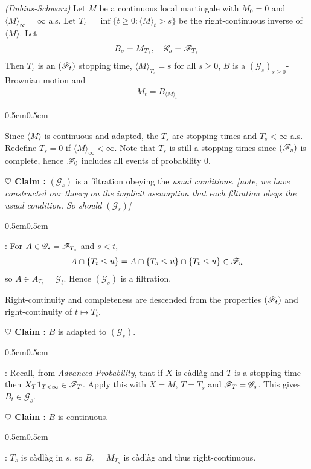 \documentclass[10pt,a4paper]{article}
\newenvironment{proof}
{\begin{changemargin}{0.5cm}{0.5cm} 
	}%
	{\end{changemargin}
}
\newenvironment{subproof}
{\begin{changemargin}{0.5cm}{0.5cm} 
	}%
	{\end{changemargin}
}
\newenvironment{p}
{\begin{proof} 
	}%
	{\end{proof}
}
\begin{document}
\thm \emph{(Dubins-Schwarz)} Let $M$ be a continuous local martingale with $M_0 =0$ and $\langle M \rangle_{\infty} =\infty$ a.s. Let $T_s = \inf \{t\geq 0 : \langle M \rangle_t >s \}$ be the right-continuous inverse of $\langle M \rangle$. Let
\begin{align*}
B_s = M_{T_s}, \quad \mathscr{G}_s = \mathscr{F}_{T_s}
\end{align*}
Then $T_s$ is an $(\mathscr{F}_t)$ stopping time, $\langle M \rangle_{T_s}=s$ for all $s\geq 0$, $B$ is a $(\mathscr{G}_s)_{s\geq 0}$-Brownian motion and
\begin{align*}
M_t = B_{\langle M \rangle_t}
\end{align*}
\begin{p}
\pf Since $\langle M \rangle$ is continuous and adapted, the $T_s$ are stopping times and $T_s < \infty$ a.s. Redefine $T_s =0$ if $\langle M \rangle_{\infty} < \infty$. Note that $T_s$ is still a stopping times since $(\mathscr{F}_s)$ is complete, hence $\mathscr{F}_0$ includes all events of probability 0.

\textbf{$\heartsuit$ Claim :} $(\mathscr{G}_s)$ is a filtration obeying the \emph{usual conditions}. \emph{[note, we have constructed our thoery on the implicit assumption that each filtration obeys the usual condition. So should $(\mathscr{G}_s)$]}
\begin{subproof}
: For $A\in \mathscr{G}_s = \mathscr{F}_{T_s}$ and $s<t$,
\begin{align*}
A \cap \{T_t \leq u\} = A \cap \{T_s \leq u \} \cap \{T_t \leq u\} \in \mathscr{F}_u
\end{align*}
so $A\in A_{T_t} = \mathscr{G}_t$. Hence $(\mathscr{G}_s)$ is a filtration.
\s

Right-continuity and completeness are descended from the properties $(\mathscr{F}_t)$ and right-continuity of $t\mapsto T_t$. 
\end{subproof}
\textbf{$\heartsuit$ Claim :} $B$ is adapted to $(\mathscr{G}_s)$.
\begin{subproof}
: Recall, from \emph{Advanced Probability}, that if $X$ is c\`adl\`ag and $T$ is a stopping time then $X_T \bm{1}_{T<\infty} \in \mathscr{F}_T$. Apply this with $X=M$, $T=T_s$ and $\mathscr{F}_T = \mathscr{G}_s$. This gives $B_t \in \mathscr{G}_s$.
\end{subproof}
\textbf{$\heartsuit$ Claim :} $B$ is continuous.
\begin{subproof}
: $T_s$ is c\`adl\`ag in $s$, so $B_s = M_{T_s}$ is c\`adl\`ag and thus right-continuous.


\end{subproof}
\end{p}
\end{document}

